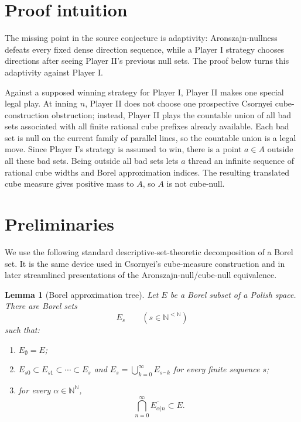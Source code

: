 \documentclass[11pt]{amsart}
\newtheorem{lemma}[theorem]{Lemma}
\newcommand{\N}{\mathbb N}
\begin{document}
\section*{Proof intuition}

The missing point in the source conjecture is adaptivity: Aronszajn-nullness
defeats every fixed dense direction sequence, while a Player I strategy chooses
directions after seeing Player II's previous null sets.  The proof below turns
this adaptivity against Player I.

Against a supposed winning strategy for Player I, Player II makes one special
legal play.  At inning \(n\), Player II does not choose one prospective
Csornyei cube-construction obstruction; instead, Player II plays the countable
union of all bad sets associated with all finite rational cube prefixes already
available.  Each bad set is null on the current family of parallel lines, so
the countable union is a legal move.  Since Player I's strategy is assumed to
win, there is a point \(a\in A\) outside all these bad sets.  Being outside all
bad sets lets \(a\) thread an infinite sequence of rational cube widths and
Borel approximation indices.  The resulting translated cube measure gives
positive mass to \(A\), so \(A\) is not cube-null.

\section*{Preliminaries}

We use the following standard descriptive-set-theoretic decomposition of a
Borel set.  It is the same device used in Csornyei's cube-measure construction
and in later streamlined presentations of the Aronszajn-null/cube-null
equivalence.

\begin{lemma}[Borel approximation tree]\label{lem:borel-tree}
Let \(E\) be a Borel subset of a Polish space.  There are Borel sets
\[
  E_s\qquad (s\in\N^{<\N})
\]
such that:
\begin{enumerate}
\item \(E_{\emptyset}=E\);
\item \(E_{s0}\subset E_{s1}\subset\cdots\subset E_s\) and
  \(E_s=\bigcup_{k=0}^{\infty}E_{s^\frown k}\) for every finite sequence \(s\);
\item for every \(\alpha\in\N^\N\),
  \[
    \bigcap_{n=0}^{\infty}\overline{E_{\alpha|n}}\subset E.
  \]
\end{enumerate}
\end{lemma}
\end{document}
